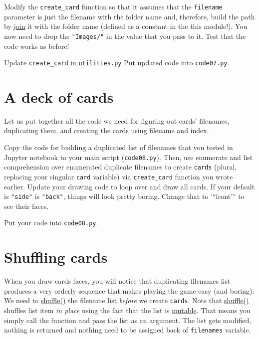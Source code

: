 \documentclass[
]{book}
\begin{document}
Modify the \texttt{create\_card} function so that it assumes that the \texttt{filename} parameter is just the filename with the folder name and, therefore, build the path by \href{https://docs.python.org/3/library/os.path.html\#os.path.join}{join} it with the folder name (defined as a constant in the this module!). You now need to drop the \texttt{"Images/"} in the value that you pass to it. Test that the code works as before!

Update \texttt{create\_card} in \texttt{utilities.py}
Put updated code into \texttt{code07.py}.

\hypertarget{a-deck-of-cards}{%
\section{A deck of cards}\label{a-deck-of-cards}}

Let us put together all the code we need for figuring out cards' filenames, duplicating them, and creating the cards using filename and index.

Copy the code for building a duplicated list of filenames that you tested in Jupyter notebook to your main script (\texttt{code08.py}). Then, use enumerate and list comprehension over enumerated duplicate filenames to create \texttt{cards} (plural, replacing your singular \texttt{card} variable) via \texttt{create\_card} function you wrote earlier. Update your drawing code to loop over and draw all cards. If your default is \texttt{"side"} is \texttt{"back"}, things will look pretty boring. Change that to '``front''` to see their faces.

Put your code into \texttt{code08.py}.

\hypertarget{shuffle}{%
\section{Shuffling cards}\label{shuffle}}

When you draw cards faces, you will notice that duplicating filenames list produces a very orderly sequence that makes playing the game easy (and boring). We need to \href{https://docs.python.org/3/library/random.html\#random.shuffle}{shuffle()} the filename list \emph{before} we create \texttt{cards}. Note that \href{https://docs.python.org/3/library/random.html\#random.shuffle}{shuffle()} shuffles list item \emph{in place} using the fact that the list is \protect\hyperlink{mutable-objects}{mutable}. That means you simply call the function and pass the list as an argument. The list gets modified, nothing is returned and nothing need to be assigned back of \texttt{filenames} variable.
\end{document}
